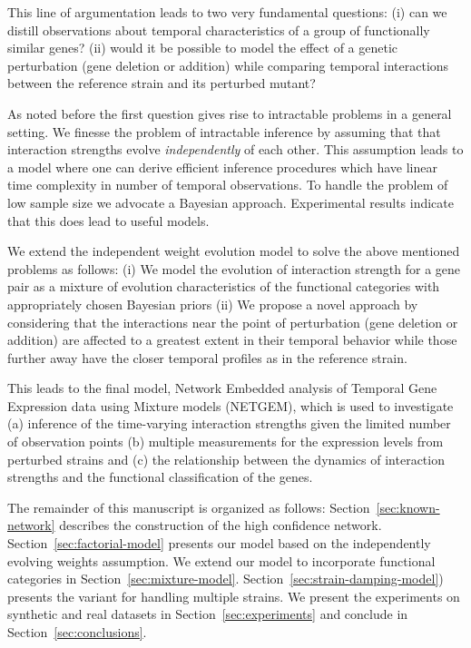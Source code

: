 \documentclass{bioinfo}
\begin{document}

This line of argumentation leads to two very fundamental questions: (i) can we distill observations about temporal characteristics of a group of functionally similar genes? (ii) would it be possible to model the effect of a genetic perturbation (gene deletion or addition) while comparing temporal interactions between the reference strain and its perturbed mutant? 

As noted before the first question gives rise to intractable problems in a 
general setting. 
We finesse the problem of intractable inference  by assuming that  
that interaction 
strengths evolve \emph{independently} of each other. 
This assumption leads to a model where one can derive efficient inference 
procedures which have linear time complexity 
in number of temporal observations.
To handle the problem of low sample size we advocate a  
Bayesian approach. 
Experimental results indicate that this does lead to useful models.  

We extend the independent weight evolution model to solve the above mentioned problems as 
follows: (i) We model the evolution of interaction strength for a gene
pair as a mixture of evolution characteristics of the functional 
categories with appropriately chosen Bayesian priors  (ii) We propose a novel approach by considering that the interactions near the point of perturbation (gene deletion or addition) are affected to a greatest extent in their temporal behavior while those further away have the closer temporal profiles as in the reference strain.

This leads to the final model,  Network Embedded analysis of Temporal
Gene Expression data using Mixture models (NETGEM), which is used to investigate (a) inference of the time-varying interaction strengths given the limited number of
observation points (b) multiple measurements for the expression levels from perturbed strains and (c) the relationship between the dynamics of interaction strengths and the functional classification of the genes. 


The remainder of this manuscript is organized as follows:
Section~\ref{sec:known-network} describes the construction of the
high confidence network. Section~\ref{sec:factorial-model} presents
our model based on the independently evolving weights assumption. We extend our model to incorporate functional categories in
Section~\ref{sec:mixture-model}. Section~\ref{sec:strain-damping-model})
presents the variant for handling multiple strains. We present the
experiments on synthetic and real datasets in
Section~\ref{sec:experiments} and conclude in Section~\ref{sec:conclusions}.
\end{document}

